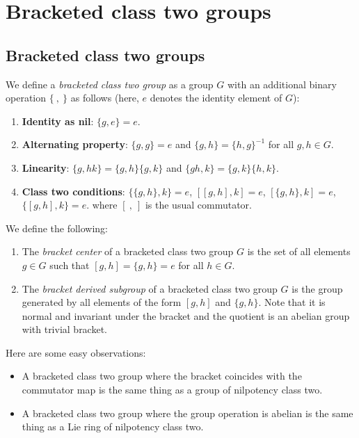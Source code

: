 \documentclass[10pt]{amsart}
\begin{document}
\section{Bracketed class two groups}

\subsection{Bracketed class two groups}

We define a {\em bracketed class two group} as a group $G$ with an
additional binary operation $\{ \ , \ \}$ as follows (here, $e$
denotes the identity element of $G$):

\begin{enumerate}
\item {\bf Identity as nil}: $\{ g,e \} = e$.
\item {\bf Alternating property}: $\{ g,g \} = e$ and $\{ g,h \} = \{
  h,g \}^{-1}$ for all $g,h \in G$.
\item {\bf Linearity}: $\{g,hk \} = \{ g,h \} \{ g,k\}$
  and $\{ gh,k \} = \{ g,k \} \{ h,k \}$.
\item {\bf Class two conditions}: $\{ \{ g,h \}, k \} = e$,
  $[[g,h],k]=e$, $[\{g,h\},k] = e$, $\{[g,h],k\} = e$. where $[ \ , \
  ]$ is the usual commutator.
\end{enumerate}

We define the following:

\begin{enumerate}
\item The {\em bracket center} of a bracketed class two group $G$ is
  the set of all elements $g \in G$ such that $[g,h] = \{ g, h \} = e$
  for all $h \in G$.
\item The {\em bracket derived subgroup} of a bracketed class two
  group $G$ is the group generated by all elements of the form $[g,h]$
  and $\{ g,h \}$. Note that it is normal and invariant under the
  bracket and the quotient is an abelian group with trivial bracket.
\end{enumerate}

Here are some easy observations:

\begin{itemize}
\item A bracketed class two group where the bracket coincides with the
  commutator map is the same thing as a group of nilpotency class two.
\item A bracketed class two group where the group operation is abelian
  is the same thing as a Lie ring of nilpotency class two.
\end{itemize}
\end{document}
